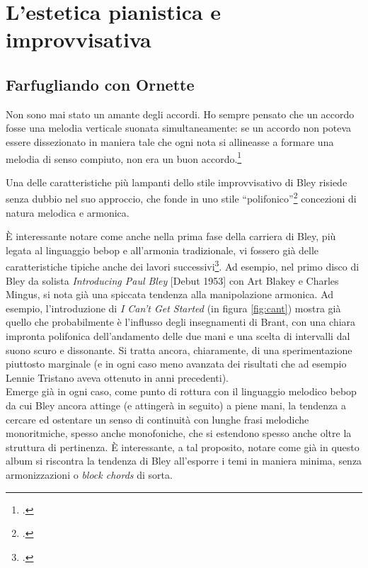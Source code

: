 \chapter{L'estetica pianistica e improvvisativa}
\section{Farfugliando con Ornette}
\begin{fquote}
	Non sono mai stato un amante degli accordi. Ho sempre pensato che un accordo fosse una melodia verticale suonata simultaneamente: se un accordo non poteva essere dissezionato in maniera tale che ogni nota si allineasse a formare una melodia di senso compiuto, non era un buon accordo.\footcite[71]{stopping}
\end{fquote}
Una delle caratteristiche più lampanti dello stile improvvisativo di Bley risiede senza dubbio nel suo approccio, che fonde in uno stile ``polifonico''\footcite[50]{cappelletti} concezioni di natura melodica e armonica. \par
È interessante notare come anche nella prima fase della carriera di Bley, più legata al linguaggio bebop e all'armonia tradizionale, vi fossero già delle caratteristiche tipiche anche dei lavori successivi\footcite[104]{dean}. Ad esempio, nel primo disco di Bley da solista \textit{Introducing Paul Bley} [Debut 1953] con Art Blakey e Charles Mingus, si nota già una spiccata tendenza alla manipolazione armonica. Ad esempio, l'introduzione di \textit{I Can't Get Started} (in figura \ref{fig:cant}) mostra già quello che probabilmente è l'influsso degli insegnamenti di Brant, con una chiara impronta polifonica dell'andamento delle due mani e una scelta di intervalli dal suono scuro e dissonante.
Si tratta ancora, chiaramente, di una sperimentazione piuttosto marginale (e in ogni caso meno avanzata dei risultati che ad esempio Lennie Tristano aveva ottenuto in anni precedenti). \\
Emerge già in ogni caso, come punto di rottura con il linguaggio melodico bebop da cui Bley ancora attinge (e attingerà in seguito) a piene mani, la tendenza a cercare ed ostentare un senso di continuità con lunghe frasi melodiche monoritmiche, spesso anche monofoniche, che si estendono spesso anche oltre la struttura di pertinenza. È interessante, a tal proposito, notare come già in questo album si riscontra la tendenza di Bley all'esporre i temi in maniera minima, senza armonizzazioni o \textit{block chords} di sorta.
